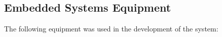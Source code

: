 \clearpage

\subsection{Embedded Systems Equipment}
The following equipment was used in the development of the system:
\begin{figure}[h]%
    \centering
    \qquad

\end{figure}
